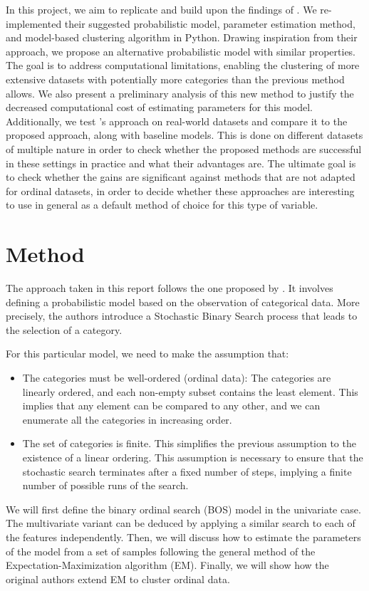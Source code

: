 \documentclass[a4paper,12pt]{article}
\newcommand{\tm}[1]{\todo[inline,color=orange!40]{{\textbf{TM:}~}#1}}
\begin{document}
In this project, we aim to replicate and build upon the findings of \cite{biernacki2016model}. We re-implemented their suggested probabilistic model, parameter estimation method, and model-based clustering algorithm in Python. Drawing inspiration from their approach, we propose an alternative probabilistic model with similar properties. The goal is to address computational limitations, enabling the clustering of more extensive datasets with potentially more categories than the previous method allows. We also present a preliminary analysis of this new method to justify the decreased computational cost of estimating parameters for this model. Additionally, we  test \cite{biernacki2016model}'s approach on real-world datasets and compare it to the proposed approach, along with baseline models. This is done on different datasets of multiple nature in order to check whether the proposed methods are successful in these settings in practice and what their advantages are. The ultimate goal is to check whether the gains are significant against methods that are not adapted for ordinal datasets, in order to decide whether these approaches are interesting to use in general as a default method of choice for this type of variable.


\section{Method}
The approach taken in this report follows the one proposed by \cite{biernacki2016model}. It involves defining a probabilistic model based on the observation of categorical data. More precisely, the authors introduce a Stochastic Binary Search process that leads to the selection of a category. 

For this particular model, we need to make the assumption that:
\begin{itemize}
    \item The categories must be well-ordered (ordinal data): The categories are linearly ordered, and each non-empty subset contains the least element. This implies that any element can be compared to any other, and we can enumerate all the categories in increasing order.
    \item The set of categories is finite. This simplifies the previous assumption to the existence of a linear ordering. This assumption is necessary to ensure that the stochastic search terminates after a fixed number of steps, implying a finite number of possible runs of the search.
\end{itemize}
We will first define the binary ordinal search (BOS) model in the univariate case. The multivariate variant can be deduced by applying a similar search to each of the features independently. Then, we will discuss how to estimate the parameters of the model from a set of samples following the general method of the Expectation-Maximization algorithm (EM). Finally, we will show how the original authors extend EM to cluster ordinal data.
\end{document}
